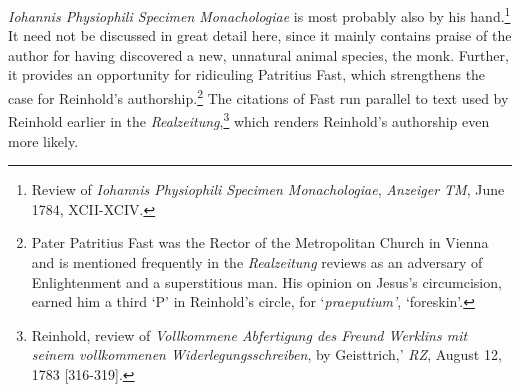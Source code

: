 \textit{Iohannis Physiophili Specimen Monachologiae }is most probably also by his hand.\footnote{ Review of \textit{Iohannis Physiophili Specimen Monachologiae}, \textit{Anzeiger TM}, June 1784, XCII{-}XCIV.} It need not be discussed in great detail here, since it mainly contains praise of the author for having discovered a new, unnatural animal species, the monk. Further, it provides an opportunity for ridiculing Patritius Fast, which strengthens the case for Reinhold's authorship.\footnote{ Pater Patritius Fast was the Rector of the Metropolitan Church in Vienna and is mentioned frequently in the \textit{Realzeitung\- }reviews as an adversary of Enlightenment and a superstitious man. His opinion on Jesus's circumcision, earned him a third `P' in Reinhold's circle, for `\textit{praeputium'}, `foreskin'.} The citations of Fast run parallel to text used by Reinhold earlier in the \textit{Realzeitung},\footnote{ Reinhold, review of \textit{Vollkommene Abfertigung des Freund Werklins mit seinem vollkommenen Widerlegungsschreiben}, by Geisttrich,' \textit{RZ}, August 12, 1783 [316{-}319].} which renders Reinhold's authorship even more likely. 

